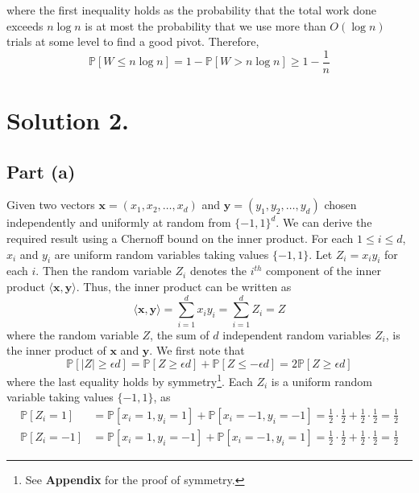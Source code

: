 \documentclass[9pt]{article}
\begin{document}
where the first inequality holds as the probability that the total work done exceeds $n \log{n}$ is
at most the probability that we use more than $O(\log{n})$ trials at some level to find a good pivot.
Therefore,
\begin{equation}
    \mathbb{P}[W \leq n \log{n}] = 1 - \mathbb{P}[W > n \log{n}] \geq 1 - \frac{1}{n}
\end{equation}

\section*{Solution 2.}
\subsection*{Part (a)}
Given two vectors $\mathbf{x} = (x_{1}, x_{2}, \dots, x_{d})$ and $\mathbf{y} = (y_{1}, y_{2}, \dots, y_{d})$
chosen independently and uniformly at random from $\{-1, 1\}^{d}$. We can derive the required result using a
Chernoff bound on the inner product. For each $1 \leq i \leq d$, $x_{i}$ and $y_{i}$ are uniform random variables
taking values $\{-1, 1\}$. Let $Z_{i} = x_{i}y_{i}$ for each $i$. Then the random variable $Z_{i}$ denotes the
$i^{th}$ component of the inner product $\langle \mathbf{x}, \mathbf{y} \rangle$. Thus, the inner product can be
written as
\begin{equation}
    \langle \mathbf{x}, \mathbf{y} \rangle = \sum_{i=1}^{d} x_{i} y_{i} = \sum_{i=1}^{d} Z_{i} = Z
\end{equation}
where the random variable $Z$, the sum of $d$ independent random variables $Z_{i}$, is the inner
product of $\mathbf{x}$ and $\mathbf{y}$. We first note that
\begin{equation}
    \label{symmetry}
    \mathbb{P}[\lvert Z \rvert \geq \epsilon d] = \mathbb{P}[Z \geq \epsilon d] + \mathbb{P}[Z \leq -\epsilon d]
    = 2 \mathbb{P}[Z \geq \epsilon d]
\end{equation}
where the last equality holds by symmetry\footnote{See \textbf{Appendix} for the proof of symmetry.}.
Each $Z_{i}$ is a uniform random variable taking values $\{-1, 1\}$, as
\begin{equation}
    \begin{split}
        \mathbb{P}[Z_{i} = 1] &= \mathbb{P}[x_{i} = 1, y_{i} = 1] + \mathbb{P}[x_{i} = -1, y_{i} = -1]
        = \frac{1}{2} \cdot \frac{1}{2} + \frac{1}{2} \cdot \frac{1}{2} = \frac{1}{2} \\
        \mathbb{P}[Z_{i} = -1] &= \mathbb{P}[x_{i} = 1, y_{i} = -1] + \mathbb{P}[x_{i} = -1, y_{i} = 1]
        = \frac{1}{2} \cdot \frac{1}{2} + \frac{1}{2} \cdot \frac{1}{2} = \frac{1}{2}
    \end{split}
\end{equation}
\end{document}
